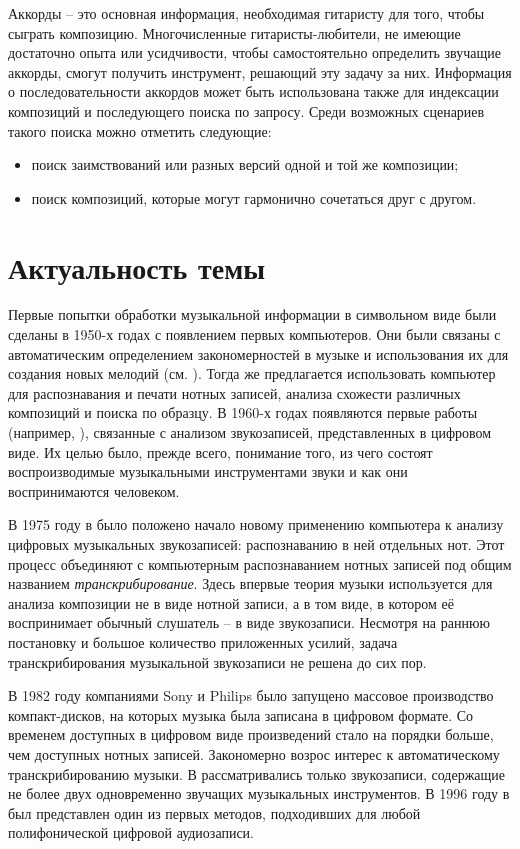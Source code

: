 Аккорды -- это основная информация, необходимая гитаристу для того, чтобы
сыграть композицию. Многочисленные гитаристы-любители, не имеющие достаточно
опыта или усидчивости, чтобы самостоятельно определить звучащие аккорды, смогут
получить инструмент, решающий эту задачу за них. Информация о последовательности
аккордов может быть использована также для индексации композиций и последующего
поиска по запросу. Среди возможных сценариев такого поиска можно отметить
следующие:
\begin{itemize}
  \item поиск заимствований или разных версий одной и той же композиции;
  \item поиск композиций, которые могут гармонично сочетаться друг с другом.
\end{itemize}

\section{Актуальность темы}

Первые попытки обработки музыкальной информации в символьном виде были сделаны в
1950-х годах с появлением первых компьютеров. Они были связаны с автоматическим
определением закономерностей в музыке и использования их для создания новых
мелодий (см. \cite{Schueler2005}). Тогда же предлагается использовать компьютер
для распознавания и печати нотных записей, анализа схожести различных композиций
и поиска по образцу. В 1960-х годах появляются первые работы (например,
\cite{Freedman1967}), связанные с анализом звукозаписей, представленных в
цифровом виде. Их целью было, прежде всего, понимание того, из чего состоят
воспроизводимые музыкальными инструментами звуки и как они воспринимаются
человеком.

В 1975 году в \cite{Moorer1975} было положено начало новому применению
компьютера к анализу цифровых музыкальных звукозаписей: распознаванию в ней
отдельных нот. Этот процесс объединяют с компьютерным распознаванием нотных
записей под общим названием \emph{транскрибирование}. Здесь впервые теория
музыки используется для анализа композиции не в виде нотной записи, а в том
виде, в котором её воспринимает обычный слушатель -- в виде звукозаписи.
Несмотря на раннюю постановку и большое количество приложенных усилий, задача
транскрибирования музыкальной звукозаписи не решена до сих пор.

В 1982 году компаниями Sony и Philips было запущено массовое производство
компакт-дисков, на которых музыка была записана в цифровом формате. Со временем
доступных в цифровом виде произведений стало на порядки больше, чем доступных
нотных записей. Закономерно возрос интерес к автоматическому транскрибированию
музыки. В \cite{Moorer1975} рассматривались только звукозаписи, содержащие не
более двух одновременно звучащих музыкальных инструментов. В 1996 году в
\cite{Martin1996} был представлен один из первых методов, подходивших для любой
полифонической цифровой аудиозаписи.

